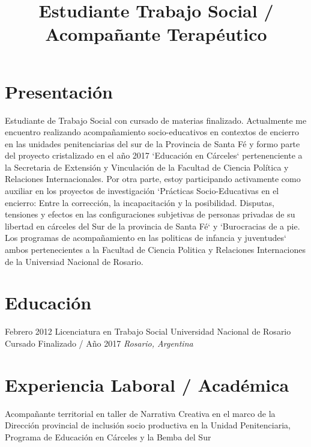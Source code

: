 \documentclass[11pt,a4paper,sans]{moderncv}        %
\title{Estudiante Trabajo Social / Acompañante Terap\'eutico}                               %
\begin{document}
\makecvtitle

\section{Presentación}
Estudiante de Trabajo Social con cursado de materias finalizado. Actualmente me encuentro realizando acompañamiento socio-educativos en contextos de encierro en las unidades penitenciarias del sur de la Provincia de Santa F\'e y formo parte del proyecto cristalizado en el año 2017 `Educación en Cárceles` pertenenciente a la Secretaria de Extensi\'on y Vinculación de la Facultad de Ciencia Pol\'itica y Relaciones Internacionales. Por otra parte, estoy participando activamente como auxiliar en los proyectos de investigaci\'on `Pr\'acticas Socio-Educativas en el encierro: Entre la correcci\'on, la incapacitación y la posibilidad. Disputas, tensiones y efectos en las configuraciones subjetivas de personas privadas de su libertad en cárceles del Sur de la provincia de Santa F\'e` y `Burocracias de a pie. Los programas de acompañamiento en las politicas de infancia y juventudes` ambos pertenecientes a la Facultad de Ciencia Politica y Relaciones Internaciones de la Universiad Nacional de Rosario.
\vspace{2mm}

\section{Educación}
\cventry
{Febrero 2012}
{Licenciatura en Trabajo Social}
{Universidad Nacional de Rosario}
{Cursado Finalizado / Año 2017}
{}
{\textit{Rosario, Argentina}}
{}
\vspace{2mm}


\section{Experiencia Laboral / Acad\'emica}
  {
    Acompañante territorial en taller de Narrativa Creativa en el marco de la Dirección provincial de inclusión socio productiva en la Unidad Penitenciaria, Programa de Educación en Cárceles y la Bemba del Sur
  }
\vspace{3mm}
\end{document}
